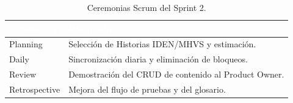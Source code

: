 \begin{table}[!ht]
    \centering
    \renewcommand{\arraystretch}{1.3}
    \fontsize{9}{10.8}\selectfont\sffamily
    \begin{tabularx}{\textwidth}{|l|X|}
        \hline
        \rowcolor{colorPrimario}
        \textcolor{white}{\textbf{Ceremonia}} & \textcolor{white}{\textbf{Resultado}} \\ \hline
        Planning & Selección de Historias IDEN/MHVS y estimación. \\ \hline
        \rowcolor{grisTecnico}
        Daily & Sincronización diaria y eliminación de bloqueos. \\ \hline
        Review & Demostración del CRUD de contenido al Product Owner. \\ \hline
        \rowcolor{grisTecnico}
        Retrospective & Mejora del flujo de pruebas y del glosario. \\ \hline
    \end{tabularx}
    \caption{Ceremonias Scrum del Sprint 2.}
    \label{tab:s2_ceremonias}
\end{table}

\clearpage
